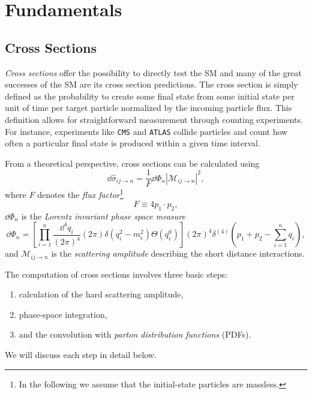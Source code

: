 
\chapter{Fundamentals}\label{chap:two}

\section{Cross Sections} \label{sec:2:cross_sections}
\textit{Cross sections} offer the possibility to directly test the \acs{SM} and many of the great successes of the \acs{SM} are its cross section predictions. The cross section is simply defined as the probability to create some final state from some initial state per unit of time per target particle normalized by the incoming particle flux. This definition allows for straightforward measurement through counting experiments. For instance, experiments like \texttt{CMS} and \texttt{ATLAS} collide particles and count how often a particular final state is produced within a given time interval.

From a theoretical perspective, cross sections can be calculated using
\begin{equation}
\dd \hat{\sigma}_{ij \rightarrow n} = \frac{1}{F} \dd \Phi_n |\mathcal{M}_{ij\rightarrow n}|^2,
\label{eq:2:Xsec}
\end{equation}
where $F$ denotes the \textit{flux factor}\footnote{In the following we assume that the initial-state particles are massless.}
\begin{equation}
F \equiv 4 p_1 \cdot p_2,
\end{equation}
$\dd \Phi_n$ is the \textit{Lorentz invariant phase space measure}
\begin{equation}
\dd \Phi_n = \left[\prod_{i = 1}^n \frac{\dd^4 q_i}{(2 \pi)^4 } (2 \pi) \delta(q_i^2 - m_i^2) \Theta(q_i^0) \right] (2 \pi)^4 \delta^{(4)} \! \left(p_1 + p_2 - \sum_{i = 1}^n q_i \right),
\end{equation}
and $\mathcal{M}_{ij\rightarrow n}$ is the \textit{scattering amplitude} describing the short distance interactions.

The computation of cross sections involves three basic steps:
\begin{enumerate}
  \item calculation of the hard scattering amplitude,
  \item phase-space integration,
  \item and the convolution with \textit{parton distribution functions} (\acs{PDF}s).
\end{enumerate}
We will discuss each step in detail below.

